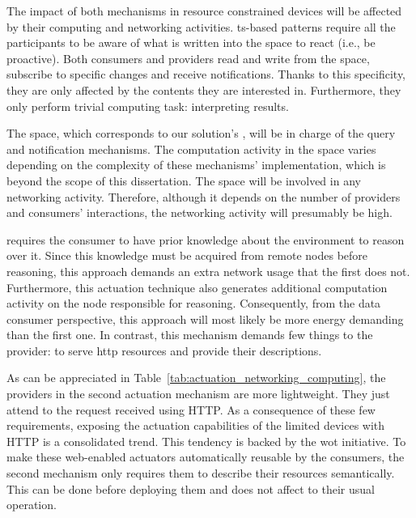 


\bigskip

The impact of both mechanisms in resource constrained devices will be affected by their computing and networking activities.
\ac{ts}-based patterns require all the participants to be aware of what is written into the space to react (i.e., be proactive).
Both consumers and providers read and write from the space, subscribe to specific changes and receive notifications.
Thanks to this specificity, they are only affected by the contents they are interested in. %
Furthermore, they only perform trivial computing task: interpreting results. %


The space, which corresponds to our solution's \coordspace{}, will be in charge of the query and notification mechanisms.
The computation activity in the space varies depending on the complexity of these mechanisms' implementation, which is beyond the scope of this dissertation.
The space will be involved in any networking activity.
Therefore, although it depends on the number of providers and consumers' interactions, the networking activity will presumably be high.


\restActuation{} requires the consumer to have prior knowledge about the environment to reason over it. %
Since this knowledge must be acquired from remote nodes before reasoning, this approach demands an extra network usage that the first does not.
Furthermore, this actuation technique also generates additional computation activity on the node responsible for reasoning.
Consequently, from the data consumer perspective, this approach will most likely be more energy demanding than the first one. %
In contrast, this mechanism demands few things to the provider: to serve \ac{http} resources and provide their descriptions. %





\bigskip


As can be appreciated in Table~\ref{tab:actuation_networking_computing}, the providers in the second actuation mechanism are more lightweight.
They just attend to the request received using HTTP.
As a consequence of these few requirements, exposing the actuation capabilities of the limited devices with HTTP is a consolidated trend.
This tendency is backed by the \ac{wot} initiative.
To make these web-enabled actuators automatically reusable by the consumers, the second mechanism only requires them to describe their resources semantically.
This can be done before deploying them and does not affect to their usual operation.


